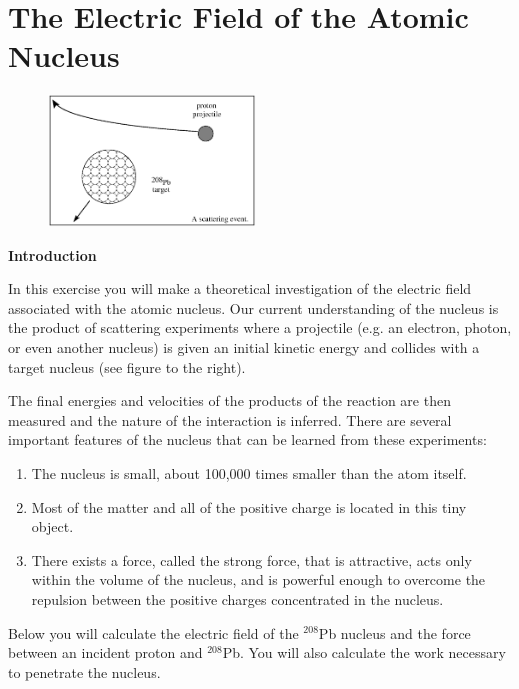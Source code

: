 \section{The Electric Field of the Atomic Nucleus}

\makelabheader %

\begin{figure}
    \includegraphics[width=0.49\textwidth]{electric_field_atomic_nucleus/electric_field_atomic_nuleus_fig_1.eps}
\end{figure}

\bigskip
\textbf{Introduction}

 
In this exercise you will make a theoretical investigation of the
electric field associated with the atomic nucleus. Our current understanding
of the nucleus is the product of scattering experiments where a projectile
(e.g. an electron, photon, or even another nucleus) is given an initial
kinetic energy and collides with a target nucleus (see figure to the right). 


The final energies and velocities of the products of the reaction
are then measured and the nature of the interaction is inferred. There
are several important features of the nucleus that can be learned
from these experiments:

\begin{enumerate}
\item The nucleus is small, about 100,000 times smaller than the atom itself.
\item Most of the matter and all of the positive charge is located in this
tiny object.
\item There exists a force, called the strong force, that is attractive,
acts only within the volume of the nucleus, and is powerful enough
to overcome the repulsion between the positive charges concentrated
in the nucleus. 
\end{enumerate}
Below you will calculate the electric field of the \( ^{208} \)Pb
nucleus and the force between an incident proton and \( ^{208} \)Pb.
You will also calculate the work necessary to penetrate the nucleus.

